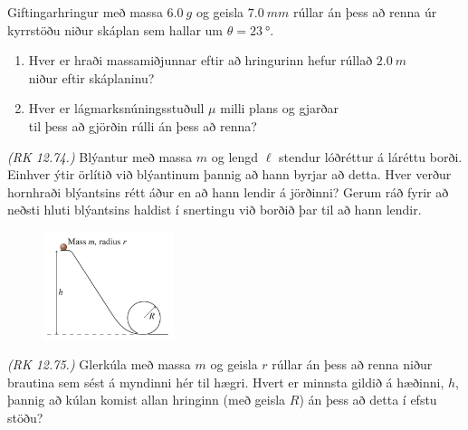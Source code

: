 \begin{enumerate}[label = \textbf{Dæmi \thechapter.\arabic*.}]
\begin{minipage}{\linewidth}
\item Giftingarhringur með massa $\SI{6,0}{g}$ og geisla $\SI{7,0}{mm}$ rúllar án þess að renna úr kyrrstöðu niður skáplan sem hallar um $\theta = \SI{23}{\degree}$.
\end{minipage}

\begin{enumerate}[label = \textbf{(\alph*)}]
    \item Hver er hraði massamiðjunnar eftir að hringurinn hefur rúllað $\SI{2.0}{m}$ \\ niður eftir skáplaninu?
    
    \item Hver er lágmarksnúningsstuðull $\mu$ milli plans og gjarðar \\ til þess að gjörðin rúlli án þess að renna?
\end{enumerate}

\item \textit{(RK 12.74.)} Blýantur með massa $m$ og lengd $\ell$ stendur lóðréttur á láréttu borði. Einhver ýtir örlítið við blýantinum þannig að hann byrjar að detta. Hver verður hornhraði blýantsins rétt áður en að hann lendir á jörðinni? Gerum ráð fyrir að neðsti hluti blýantsins haldist í snertingu við borðið þar til að hann lendir.

\vspace{0.5cm}


\begin{minipage}{\linewidth}

\begin{figure}
\vspace{-0.75cm}
\includegraphics[width=1.5in]{images/usapho.png}
\end{figure}


\item \textit{(RK 12.75.)} Glerkúla með massa $m$ og geisla $r$ rúllar án þess að renna niður brautina sem sést á myndinni hér til hægri. Hvert er minnsta gildið á hæðinni, $h$, þannig að kúlan komist allan hringinn (með geisla $R$) án þess að detta í efstu stöðu?
\end{minipage}




\end{enumerate}
